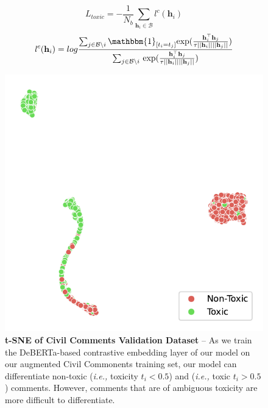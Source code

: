 \[
    L_{toxic} = -\frac{1}{N_b} \sum_{\mathbf{h}_i \in \mathcal{B}}\mathit {l}^c(\mathbf{h}_i )
\]
\[
\mathit{l}^c(\mathbf{h}_i) = {log}\frac{ \sum_{j\in\mathcal{B}\setminus i } \mathbbm{1}_{[t_i = t_j]}\mathrm{exp}( \frac{\mathbf{h}_i^\top \mathbf{h}_j}{\tau||\mathbf{h}_i || ||\mathbf{h}_j || })}{\sum_{j\in\mathcal{B}\setminus i } \, \mathrm{exp}( \frac{\mathbf{h}_i^\top \mathbf{h}_j}{\tau||\mathbf{h}_i || ||\mathbf{h}_j || })}
\]
\begin{figure}
\begin{minipage}[l]{0.5\textwidth}
\includegraphics[width=1\columnwidth]{figures/toxicity_training_tsne.pdf} 
\end{minipage}
\begin{minipage}[l]{0.35\textwidth}
\caption{\textbf{t-SNE of Civil Comments Validation Dataset }-- As we train the DeBERTa-based contrastive embedding layer of our model on our augmented Civil Commonents training set, our model can differentiate non-toxic (\textit{i.e.,} toxicity $t_i < 0.5$) and (\textit{i.e.,} toxic $t_i > 0.5$) comments. However, comments that are of ambiguous toxicity are more difficult to differentiate.\label{figure:tsne} }
\end{minipage}

\end{figure}



